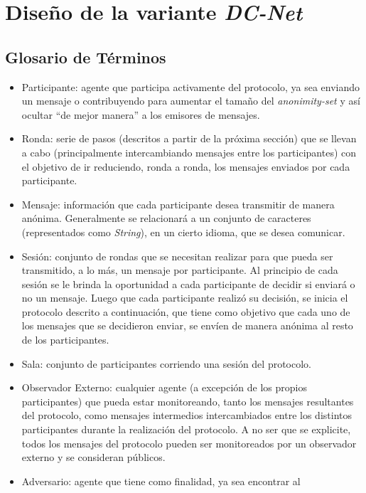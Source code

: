 \chapter{Diseño de la variante \emph{DC-Net}}\label{cap3}

\section{Glosario de Términos}

\begin{itemize}
    \item Participante: agente que participa activamente del protocolo, ya sea 
    enviando un mensaje o contribuyendo para aumentar el tamaño del 
    \emph{anonimity-set} y así ocultar ``de mejor manera'' a los emisores de 
    mensajes. 
    \item Ronda: serie de pasos (descritos a partir de la próxima sección) que 
    se llevan a cabo (principalmente intercambiando mensajes entre los 
    participantes) con el objetivo de ir reduciendo, ronda a ronda, los mensajes 
    enviados por cada participante.  
    \item Mensaje: información que cada participante desea transmitir de 
    manera anónima. Generalmente se relacionará a un conjunto de caracteres 
    (representados como \emph{String}), en un cierto idioma, que se desea 
    comunicar.
    \item Sesión: conjunto de rondas que se necesitan realizar para que pueda 
    ser transmitido, a lo más, un mensaje por participante. Al principio de 
    cada sesión se le brinda la oportunidad a cada participante de decidir si 
    enviará o no un mensaje. Luego que cada participante realizó su decisión, 
    se inicia el protocolo descrito a continuación, que tiene como objetivo 
    que cada uno de los mensajes que se decidieron enviar, se envíen de manera 
    anónima al resto de los participantes.
    \item Sala: conjunto de participantes corriendo una sesión del protocolo.
    \item Observador Externo: cualquier agente (a excepción de los propios 
    participantes) que pueda estar monitoreando, tanto los mensajes 
    resultantes del protocolo, como mensajes intermedios intercambiados entre 
    los distintos participantes durante la realización del protocolo. A no ser 
    que se explicite, todos los mensajes del protocolo pueden ser monitoreados 
    por un observador externo y se consideran públicos.
    \item Adversario: agente que tiene como finalidad, ya sea encontrar al 

\end{itemize}
